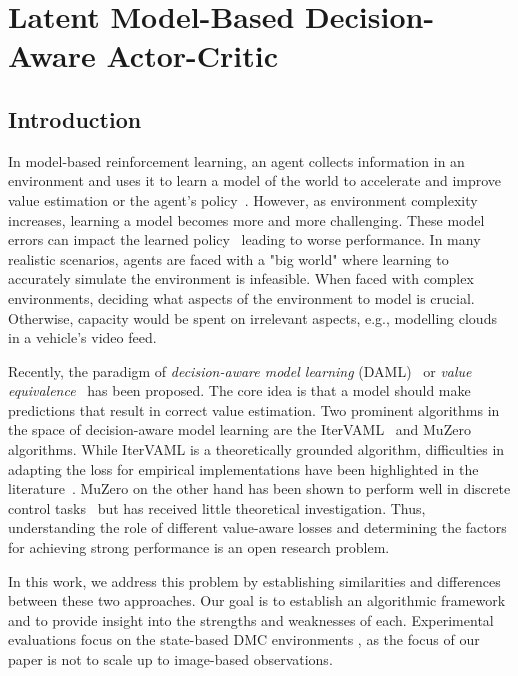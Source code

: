 \chapter{Latent Model-Based Decision-Aware Actor-Critic}
\label{chap:cvaml}

\newcommand{\rev}[1]{#1}

\section{Introduction}
In model-based reinforcement learning, an agent collects information in an environment and uses it to learn a model of the world to accelerate and improve value estimation or the agent's policy~\parencite{dyna,deisenroth2011pilco, Hafner2020Dream,schrittwieser2020mastering}.
However, as environment complexity increases, learning a model becomes more and more challenging. 
These model errors can impact the learned policy~\parencite{schneider1997exploiting,kearns2002near,talvitie2017self,lambert202objective} leading to worse performance.
In many realistic scenarios, agents are faced with a "big world" where learning to accurately simulate the environment is infeasible.
When faced with complex environments, deciding what aspects of the environment to model is crucial.
Otherwise, capacity would be spent on irrelevant aspects, e.g., modelling clouds in a vehicle's video feed.

Recently, the paradigm of \emph{decision-aware model learning} (DAML)~\parencite{vaml} or \emph{value equivalence}~\parencite{grimm2020value,grimm2021proper} has been proposed.
The core idea is that a model should make predictions that result in correct value estimation.
Two prominent algorithms in the space of decision-aware model learning are the IterVAML~\parencite{itervaml} and MuZero~\parencite{schrittwieser2020mastering} algorithms.
While IterVAML is a theoretically grounded algorithm, difficulties in adapting the loss for empirical implementations have been highlighted in the literature~\parencite{lovatto2020decision,voelcker2022value}.
MuZero on the other hand has been shown to perform well in discrete control tasks~\parencite{schrittwieser2020mastering,ye2021mastering} but has received little theoretical investigation. Thus, understanding the role of different value-aware losses and determining the factors for achieving strong performance is an open research problem.

In this work, we address this problem by establishing similarities and differences between these two approaches. 
Our goal is to establish an algorithmic framework and to provide insight into the strengths and weaknesses of each.
Experimental evaluations focus on the state-based DMC environments \parencite{tunyasuvunakool2020}, as the focus of our paper is not to scale up to image-based observations.

